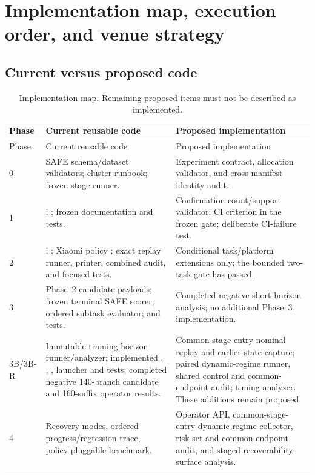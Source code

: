 \clearpage
\section{Implementation map, execution order, and venue strategy}

\subsection{Current versus proposed code}

\begin{longtable}{P{0.19\textwidth}P{0.37\textwidth}P{0.36\textwidth}}
\caption{Implementation map. Remaining proposed items must not be described as implemented.}\label{tab:module-map}\\
\toprule
Phase & Current reusable code & Proposed implementation \\
\midrule
\endfirsthead
\toprule
Phase & Current reusable code & Proposed implementation \\
\midrule
{} & SAFE schema/dataset validators; cluster runbook; frozen stage runner. & Experiment contract, allocation validator, and cross-manifest identity audit. \\
1 & ; ; frozen documentation and tests. & Confirmation count/support validator; CI criterion in the frozen gate; deliberate CI-failure test. \\
2 & ; ; Xiaomi policy ; exact replay runner, printer, combined audit, and focused tests. & Conditional task/platform extensions only; the bounded two-task gate has passed. \\
3 & Phase~2 candidate payloads; frozen terminal SAFE scorer; ordered subtask evaluator;  and tests. & Completed negative short-horizon analysis; no additional Phase~3 implementation. \\
3B/3B-R & Immutable training-horizon runner/analyzer; implemented , , , launcher and tests; completed negative 140-branch candidate and 160-suffix operator results. & Common-stage-entry nominal replay and earlier-state capture; paired dynamic-regime runner, shared control and common-endpoint audit; timing analyzer. These additions remain proposed. \\
4 & Recovery modes, ordered progress/regression trace, policy-pluggable benchmark. & Operator API, common-stage-entry dynamic-regime collector, risk-set and common-endpoint audit, and staged recoverability-surface analysis. \\

\end{longtable}
